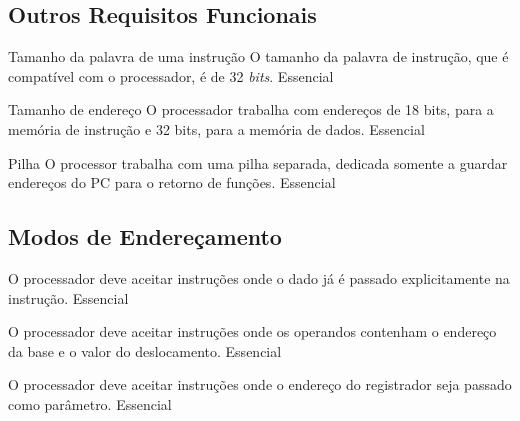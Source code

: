 \documentclass{article}
\begin{document}
	\subsection{Outros Requisitos Funcionais}

    \begin{functional}     
     
     \requirement
      {Tamanho da palavra de uma instrução}
      {O tamanho da palavra de instrução, que é compatível com o processador, é de 32 \textit{bits}.}
      {Essencial}
      
	\end{functional}
	
	 \begin{functional}     
     
     \requirement
      {Tamanho de endereço}
      {O processador trabalha com endereços de 18 bits, para a memória de instrução e 32 bits, para a memória de dados. }
      {Essencial}
      
	\end{functional}
	
	\begin{functional}     
     
     \requirement
      {Pilha}
      {O processor trabalha com uma pilha separada, dedicada somente a guardar endereços do PC para o retorno de funções.}
      {Essencial}
      
	\end{functional}

	\subsection{Modos de Endereçamento}

	\begin{functional}

      {O processador deve aceitar instruções onde o dado já é passado explicitamente na instrução.}
      {Essencial}

      {O processador deve aceitar instruções onde os operandos contenham o endereço da base e o valor do deslocamento.}
      {Essencial}

      {O processador deve aceitar instruções onde o endereço do registrador seja passado como parâmetro.}
      {Essencial}

     \end{functional}
\end{document}
